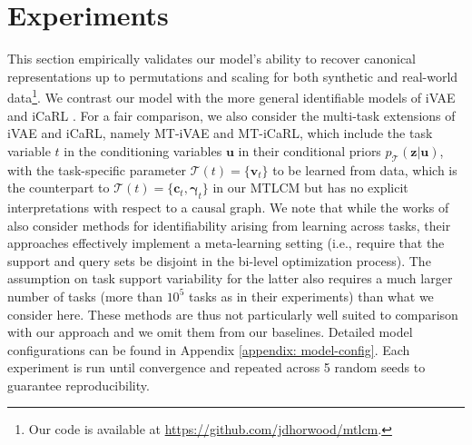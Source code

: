 \documentclass[10pt]{article} %
\theoremstyle{plain}
\theoremstyle{definition}
\begin{document}
\section{Experiments}\label{sec:experiments}
This section empirically validates our model's ability to recover canonical representations up to permutations and scaling for 
both synthetic and real-world data\footnote{Our code is available at \url{https://github.com/jdhorwood/mtlcm}.}.
We contrast our model with the more general identifiable models of iVAE \citep{Khemakhem_Kingma_Monti_Hyvarinen_2020} and iCaRL \citep{Lu_Wu_Hernandez-Lobato_Scholkopf_2022}. For a fair comparison, we also consider the multi-task extensions of iVAE and iCaRL, namely MT-iVAE and MT-iCaRL, which include the task variable $t$ in the conditioning variables $\mathbf{u}$ in their conditional priors $p_{\mathcal{T}}(\mathbf{z}|\mathbf{u})$, with the task-specific parameter $\mathcal{T}(t)=\{\mathbf{v}_t\}$ to be learned from data, which is the counterpart to $\mathcal{T}(t)=\{\mathbf{c}_t,\boldsymbol{\gamma}_t\}$ in our MTLCM but has no explicit interpretations with respect to a causal graph. We note that while the works of \citet{Fumero_Wenzel_Zancato_Achille_Rodolà_Soatto_Schölkopf_Locatello_2023, Lachapelle_Deleu_Mahajan_Mitliagkas_Bengio_Lacoste-Julien_Bertrand_2023} also consider methods for identifiability arising from learning across tasks, their approaches effectively implement a meta-learning setting (i.e., require that the support and query sets be disjoint in the bi-level optimization process). The assumption on task support variability for the latter also requires a much larger number of tasks (more than $10^5$ tasks as in their experiments) than what we consider here. These methods are thus not particularly well suited to comparison with our approach and we omit them from our baselines.
Detailed model configurations can be found in Appendix \ref{appendix: model-config}. Each experiment is run until convergence and repeated across 5 random seeds to guarantee reproducibility.
\end{document}

